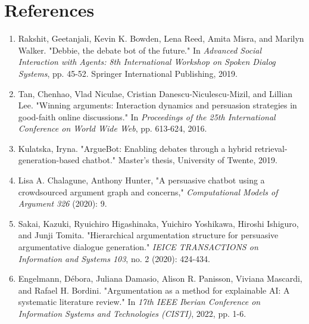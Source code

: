 \documentclass[12pt]{article}
\begin{document}
\section*{References}
\begin{enumerate}
    \item Rakshit, Geetanjali, Kevin K. Bowden, Lena Reed, Amita Misra, and Marilyn Walker. "Debbie, the debate bot of the future." In \textit{Advanced Social Interaction with Agents: 8th International Workshop on Spoken Dialog Systems}, pp. 45-52. Springer International Publishing, 2019.
    \item Tan, Chenhao, Vlad Niculae, Cristian Danescu-Niculescu-Mizil, and Lillian Lee. "Winning arguments: Interaction dynamics and persuasion strategies in good-faith online discussions." In \textit{Proceedings of the 25th International Conference on World Wide Web}, pp. 613-624, 2016.
    \item Kulatska, Iryna. "ArgueBot: Enabling debates through a hybrid retrieval-generation-based chatbot." Master's thesis, University of Twente, 2019.
    \item Lisa A. Chalagune, Anthony Hunter, "A persuasive chatbot using a crowdsourced argument graph and concerns," \textit{Computational Models of Argument 326} (2020): 9.
    \item Sakai, Kazuki, Ryuichiro Higashinaka, Yuichiro Yoshikawa, Hiroshi Ishiguro, and Junji Tomita. "Hierarchical argumentation structure for persuasive argumentative dialogue generation." \textit{IEICE TRANSACTIONS on Information and Systems 103}, no. 2 (2020): 424-434.
    \item Engelmann, Débora, Juliana Damasio, Alison R. Panisson, Viviana Mascardi, and Rafael H. Bordini. "Argumentation as a method for explainable AI: A systematic literature review." In \textit{17th IEEE Iberian Conference on Information Systems and Technologies (CISTI)}, 2022, pp. 1-6.
\end{enumerate}
\end{document}
